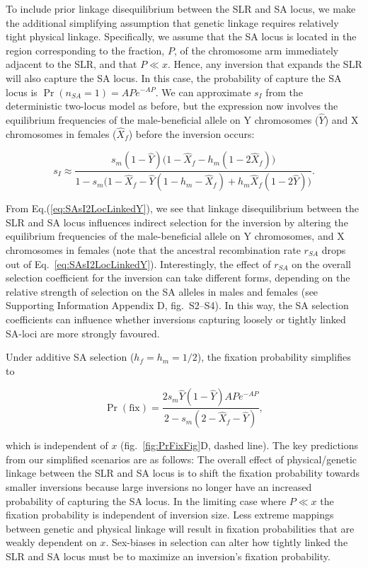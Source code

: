 \documentclass{article}[12pt]
\begin{document}
To include prior linkage disequilibrium between the SLR and SA locus, we make the additional simplifying assumption that genetic linkage requires relatively tight physical linkage. Specifically, we assume that the SA locus is located in the region corresponding to the fraction, $P$, of the chromosome arm immediately adjacent to the SLR, and that $P \ll x$. Hence, any inversion that expands the SLR will also capture the SA locus. In this case, the probability of capture the SA locus is $\Pr(n_{SA} = 1) = AP e^{-AP}$. We can approximate $s_I$ from the deterministic two-locus model as before, but the expression now involves the equilibrium frequencies of the male-beneficial allele on Y chromosomes ($\hat{Y}$) and X chromosomes in females ($\hat{X}_f$) before the inversion occurs:
\begin{linenomath*}
\begin{equation}\label{eq:SAsI2LocLinkedY}
	s_I \approx \frac{ s_m(1 - \hat{Y}) \big( 1 - \hat{X}_f - h_m(1 - 2\hat{X}_f) \big)} { 1 - s_m \big(1 - \hat{X}_f - \hat{Y}(1 - h_m - \hat{X}_f) + h_m \hat{X}_f(1 - 2 \hat{Y}) \big) }.
\end{equation}
\end{linenomath*}

\noindent From Eq.(\ref{eq:SAsI2LocLinkedY}), we see that linkage disequilibrium between the SLR and SA locus influences indirect selection for the inversion by altering the equilibrium frequencies of the male-beneficial allele on Y chromosomes, and X chromosomes in females (note that the ancestral recombination rate $r_{SA}$ drops out of Eq.~\ref{eq:SAsI2LocLinkedY}). Interestingly, the effect of $r_{SA}$ on the overall selection coefficient for the inversion can take different forms, depending on the relative strength of selection on the SA alleles in males and females (see Supporting Information Appendix D, fig.~S2--S4). In this way, the SA selection coefficients can influence whether inversions capturing loosely or tightly linked SA-loci are more strongly favoured. 

Under additive SA selection ($h_f = h_m = 1/2$), the fixation probability simplifies to
\begin{linenomath*}
\begin{equation}\label{eq:SAsIpFix2LocLinked}
	\Pr(\text{fix}) = \frac{ 2 s_m \hat{Y} (1 - \hat{Y}) A P e^{-A P}}{ 2 - s_m (2 - \hat{X}_f - \hat{Y}) },
\end{equation}
\end{linenomath*}

\noindent which is independent of $x$ (fig.~\ref{fig:PrFixFig}D, dashed line). The key predictions from our simplified scenarios are as follows: The overall effect of physical/genetic linkage between the SLR and SA locus is to shift the fixation probability towards smaller inversions because large inversions no longer have an increased probability of capturing the SA locus. In the limiting case where $P \ll x$ the fixation probability is independent of inversion size. Less extreme mappings between genetic and physical linkage will result in fixation probabilities that are weakly dependent on $x$. Sex-biases in selection can alter how tightly linked the SLR and SA locus must be to maximize an inversion's fixation probability.
\end{document}
